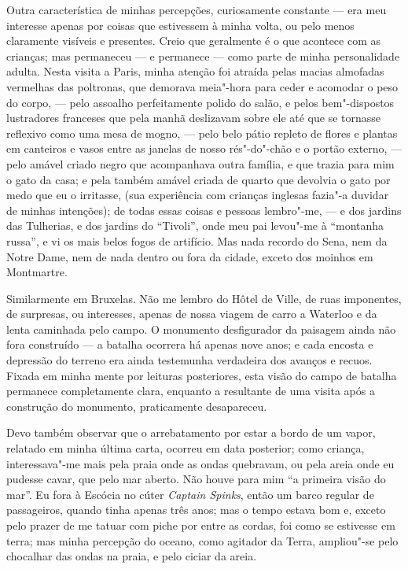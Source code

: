 Outra característica de minhas percepções, curiosamente constante
--- era meu interesse apenas por coisas que estivessem à minha volta, ou
pelo menos claramente visíveis e presentes. Creio que geralmente é o que
acontece com as crianças; mas permaneceu --- e permanece --- como parte de
minha personalidade adulta. Nesta visita a Paris, minha atenção foi
atraída pelas macias almofadas vermelhas das poltronas, que demorava
meia"-hora para ceder e acomodar o peso do corpo, --- pelo assoalho
perfeitamente polido do salão, e pelos bem"-dispostos lustradores
franceses que pela manhã deslizavam sobre ele até que se tornasse
reflexivo como uma mesa de mogno, --- pelo belo pátio repleto de flores e
plantas em canteiros e vasos entre as janelas de nosso rés"-do"-chão e o
portão externo, --- pelo amável criado negro que acompanhava outra
família, e que trazia para mim o gato da casa; e pela também amável
criada de quarto que devolvia o gato por medo que eu o irritasse, (sua
experiência com crianças inglesas fazia"-a duvidar de minhas intenções);
de todas essas coisas e pessoas lembro"-me, --- e dos jardins das
Tulherias, e dos jardins do ``Tivoli'', onde meu pai levou"-me à
``montanha russa'', e vi os mais belos fogos de artifício. Mas nada
recordo do Sena, nem da Notre Dame, nem de nada dentro ou fora da
cidade, exceto dos moinhos em Montmartre.

Similarmente em Bruxelas. Não me lembro do Hôtel de Ville, de ruas
imponentes, de surpresas, ou interesses, apenas de nossa viagem de carro
a Waterloo e da lenta caminhada pelo campo. O monumento desfigurador da
paisagem ainda não fora construído --- a batalha ocorrera há apenas nove
anos; e cada encosta e depressão do terreno era ainda testemunha
verdadeira dos avanços e recuos. Fixada em minha mente por leituras
posteriores, esta visão do campo de batalha permanece completamente
clara, enquanto a resultante de uma visita após a construção do
monumento, praticamente desapareceu.

Devo também observar que o arrebatamento por estar a bordo de um vapor,
relatado em minha última carta, ocorreu em data posterior; como criança,
interessava"-me mais pela praia onde as ondas quebravam, ou pela areia
onde eu pudesse cavar, que pelo mar aberto. Não houve para mim ``a
primeira visão do mar''. Eu fora à Escócia no cúter \textit{Captain
Spinks}, então um barco regular de passageiros, quando tinha apenas três
anos; mas o tempo estava bom e, exceto pelo prazer de me tatuar com
piche por entre as cordas, foi como se estivesse em terra; mas minha
percepção do oceano, como agitador da Terra, ampliou"-se pelo chocalhar
das ondas na praia, e pelo ciciar da areia.

